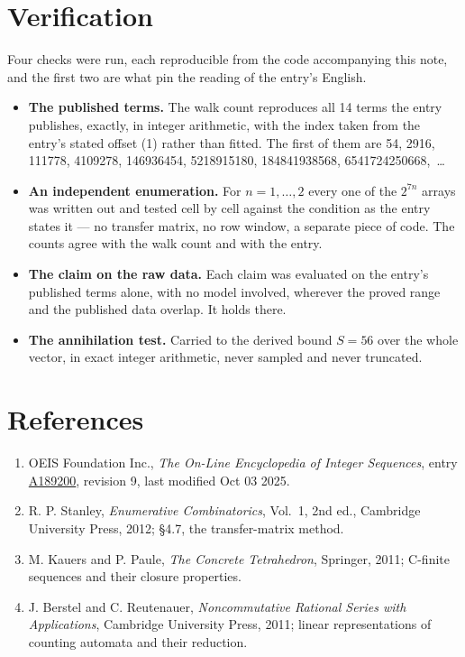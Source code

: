 \documentclass[11pt]{article}
\theoremstyle{definition}
\begin{document}
\section{Verification}

Four checks were run, each reproducible from the code accompanying this note, and the first two are what pin the reading of the entry's English.

\begin{itemize}

\item {\bfseries The published terms.} The walk count reproduces all 14 terms the entry publishes, exactly, in integer arithmetic, with the index taken from the entry's stated offset (1) rather than fitted. The first of them are 54, 2916, 111778, 4109278, 146936454, 5218915180, 184841938568, 6541724250668,~\dots

\item {\bfseries An independent enumeration.} For $n = 1,\dots,2$ every one of the $2^{7n}$ arrays was written out and tested cell by cell against the condition as the entry states it --- no transfer matrix, no row window, a separate piece of code. The counts agree with the walk count and with the entry.

\item {\bfseries The claim on the raw data.} Each claim was evaluated on the entry's published terms alone, with no model involved, wherever the proved range and the published data overlap. It holds there.

\item {\bfseries The annihilation test.} Carried to the derived bound $S = 56$ over the whole vector, in exact integer arithmetic, never sampled and never truncated.

\end{itemize}

\section{References}

\begin{enumerate}

\item OEIS Foundation Inc., \emph{The On-Line Encyclopedia of Integer Sequences}, entry \href{https://oeis.org/A189200}{A189200}, revision 9, last modified Oct 03 2025.

\item R. P. Stanley, \emph{Enumerative Combinatorics}, Vol.~1, 2nd ed., Cambridge University Press, 2012; \S4.7, the transfer-matrix method.

\item M. Kauers and P. Paule, \emph{The Concrete Tetrahedron}, Springer, 2011; C-finite sequences and their closure properties.

\item J. Berstel and C. Reutenauer, \emph{Noncommutative Rational Series with Applications}, Cambridge University Press, 2011; linear representations of counting automata and their reduction.

\end{enumerate}
\end{document}
